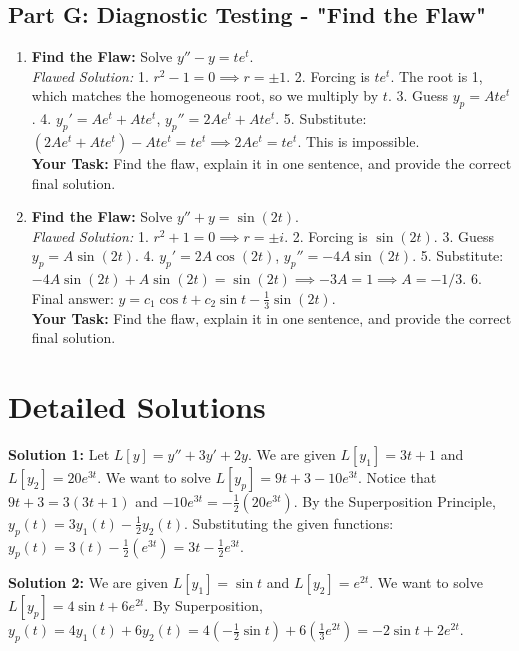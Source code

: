 \documentclass[11pt]{article}
\begin{document}
\subsection*{Part G: Diagnostic Testing - "Find the Flaw"}
\begin{enumerate}[resume]
    \item \textbf{Find the Flaw:} Solve $y'' - y = t e^t$. \\
    \textit{Flawed Solution:} 1. $r^2 - 1 = 0 \implies r = \pm 1$. 2. Forcing is $t e^t$. The root is 1, which matches the homogeneous root, so we multiply by $t$. 3. Guess $y_p = A t e^t$. 4. $y_p' = A e^t + A t e^t$, $y_p'' = 2A e^t + A t e^t$. 5. Substitute: $(2A e^t + A t e^t) - A t e^t = t e^t \implies 2A e^t = t e^t$. This is impossible. \\
    \textbf{Your Task:} Find the flaw, explain it in one sentence, and provide the correct final solution.
    
    \item \textbf{Find the Flaw:} Solve $y'' + y = \sin(2t)$. \\
    \textit{Flawed Solution:} 1. $r^2 + 1 = 0 \implies r = \pm i$. 2. Forcing is $\sin(2t)$. 3. Guess $y_p = A\sin(2t)$. 4. $y_p' = 2A\cos(2t)$, $y_p'' = -4A\sin(2t)$. 5. Substitute: $-4A\sin(2t) + A\sin(2t) = \sin(2t) \implies -3A = 1 \implies A = -1/3$. 6. Final answer: $y = c_1\cos t + c_2\sin t - \frac{1}{3}\sin(2t)$. \\
    \textbf{Your Task:} Find the flaw, explain it in one sentence, and provide the correct final solution.
\end{enumerate}

\newpage

\section{Detailed Solutions}

\textbf{Solution 1:}
Let $L[y] = y'' + 3y' + 2y$. We are given $L[y_1] = 3t + 1$ and $L[y_2] = 20e^{3t}$. We want to solve $L[y_p] = 9t + 3 - 10e^{3t}$. Notice that $9t + 3 = 3(3t + 1)$ and $-10e^{3t} = -\frac{1}{2}(20e^{3t})$. By the Superposition Principle, $y_p(t) = 3y_1(t) - \frac{1}{2}y_2(t)$. Substituting the given functions: $y_p(t) = 3(t) - \frac{1}{2}(e^{3t}) = 3t - \frac{1}{2}e^{3t}$.

\textbf{Solution 2:}
We are given $L[y_1] = \sin t$ and $L[y_2] = e^{2t}$. We want to solve $L[y_p] = 4\sin t + 6e^{2t}$. By Superposition, $y_p(t) = 4y_1(t) + 6y_2(t) = 4(-\frac{1}{2}\sin t) + 6(\frac{1}{3}e^{2t}) = -2\sin t + 2e^{2t}$.
\end{document}
